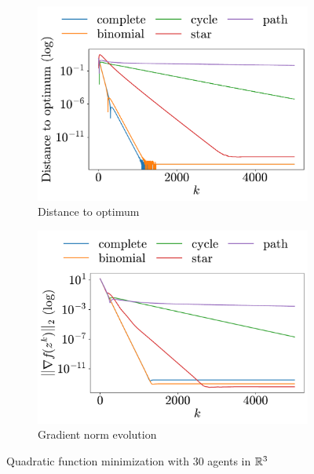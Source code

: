 \documentclass[a4paper,11pt,oneside]{book}
\begin{document}
\begin{figure}[h!]
      \centering
      \begin{subfigure}[h]{0.42\linewidth}
            \centering
            \includegraphics[width=\linewidth]{./figs/quadratic/30_3/distance.pdf} 
            \caption{Distance to optimum}
      \end{subfigure}
      \hfill
      \begin{subfigure}[h]{0.42\linewidth}
            \centering
            \includegraphics[width=\linewidth]{./figs/quadratic/30_3/gradient.pdf} 
            \caption{Gradient norm evolution}
      \end{subfigure}
      \caption{Quadratic function minimization with $30$ agents in ${\mathbb{R}}^{3}$}
      \label{fig:quadratic_30_3}
\end{figure}
\end{document}
